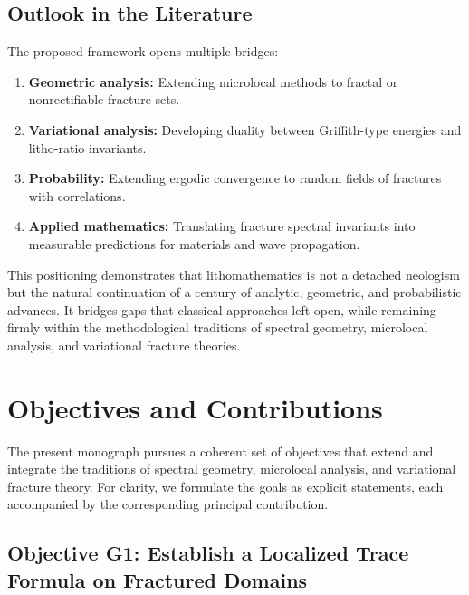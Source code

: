\subsection*{Outlook in the Literature}

The proposed framework opens multiple bridges:

\begin{enumerate}
  \item \textbf{Geometric analysis:} Extending microlocal methods to
  fractal or nonrectifiable fracture sets.
  \item \textbf{Variational analysis:} Developing duality between
  Griffith-type energies and litho-ratio invariants.
  \item \textbf{Probability:} Extending ergodic convergence to random
  fields of fractures with correlations.
  \item \textbf{Applied mathematics:} Translating fracture spectral
  invariants into measurable predictions for materials and wave
  propagation.
\end{enumerate}

This positioning demonstrates that lithomathematics is not a detached
neologism but the natural continuation of a century of analytic,
geometric, and probabilistic advances. It bridges gaps that classical
approaches left open, while remaining firmly within the methodological
traditions of spectral geometry, microlocal analysis, and variational
fracture theories.


\section{Objectives and Contributions}

The present monograph pursues a coherent set of objectives that extend
and integrate the traditions of spectral geometry, microlocal analysis,
and variational fracture theory. For clarity, we formulate the goals as
explicit statements, each accompanied by the corresponding principal
contribution.

\subsection*{Objective G1: Establish a Localized Trace Formula on Fractured Domains}

